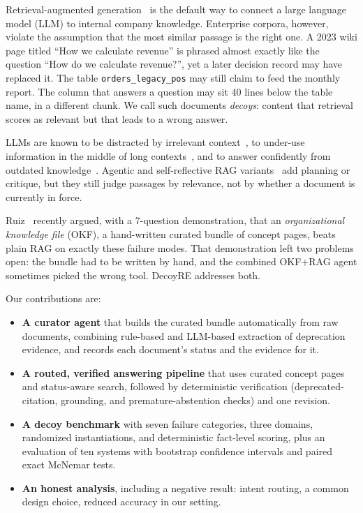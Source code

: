 \documentclass[conference]{IEEEtran}
\begin{document}
Retrieval-augmented generation~\cite{lewis2020rag,gao2023survey} is the default way to connect a
large language model (LLM) to internal company knowledge. Enterprise corpora, however, violate the
assumption that the most similar passage is the right one. A 2023 wiki page titled ``How we calculate
revenue'' is phrased almost exactly like the question ``How do we calculate revenue?'', yet a later decision
record may have replaced it. The table \texttt{orders\_legacy\_pos} may still claim to feed the monthly report.
The column that answers a question may sit 40 lines below the table name, in a different chunk.
We call such documents \emph{decoys}: content that retrieval scores as relevant but that leads to a wrong answer.

LLMs are known to be distracted by irrelevant context~\cite{shi2023distracted}, to under-use information
in the middle of long contexts~\cite{liu2024lost}, and to answer confidently from outdated
knowledge~\cite{kasai2023realtimeqa,vu2024freshllms}. Agentic and self-reflective RAG
variants~\cite{yao2023react,asai2024selfrag,yan2024crag,jeong2024adaptive} add planning or critique, but they
still judge passages by relevance, not by whether a document is currently in force.

Ruiz~\cite{ruiz2026okf} recently argued, with a 7-question demonstration, that an \emph{organizational
knowledge file} (OKF), a hand-written curated bundle of concept pages, beats plain RAG on exactly these
failure modes. That demonstration left two problems open: the bundle had to be written by hand, and the
combined OKF+RAG agent sometimes picked the wrong tool. DecoyRE addresses both.

\noindent Our contributions are:
\begin{itemize}
\item \textbf{A curator agent} that builds the curated bundle automatically from raw documents, combining
rule-based and LLM-based extraction of deprecation evidence, and records each document's status and the
evidence for it.
\item \textbf{A routed, verified answering pipeline} that uses curated concept pages and status-aware search,
followed by deterministic verification (deprecated-citation, grounding, and premature-abstention checks) and one
revision.
\item \textbf{A decoy benchmark} with seven failure categories, three domains, randomized instantiations, and
deterministic fact-level scoring, plus an evaluation of ten systems with bootstrap confidence intervals and
paired exact McNemar tests.
\item \textbf{An honest analysis}, including a negative result: intent routing, a common design choice,
reduced accuracy in our setting.
\end{itemize}
\end{document}

